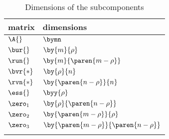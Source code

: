 \begin{table}[htdp]
\caption[Dimensions of the subcomponents]{Dimensions of the subcomponents}
\begin{center}
\begin{tabular}{ll}
%
  matrix    & dimensions \\\hline
%
\arrayrulecolor{gray}
%
  $\A{}$      & $\bymn$ \\\hline
%
  $\bur{}$    & $\by{m}{\rho}$ \\
%
  $\run{}$    & $\by{m}{\paren{m-\rho}}$ \\[3pt]\hline
%
  $\bvr{*}$   & $\by{\rho}{n}$ \\
%
  $\rvn{*}$   & $\by{\paren{n-\rho}}{n}$ \\[3pt]\hline
%
  $\ess{}$    & $\byy{\rho}$ \\
%
  $\zero_{1}$ & $\by{\rho}{\paren{n-\rho}}$ \\
%
  $\zero_{2}$ & $\by{\paren{m-\rho}}{\rho}$ \\
%
  $\zero_{3}$ & $\by{\paren{m-\rho}}{\paren{n-\rho}}$ \\
%
\arrayrulecolor{black}
%
\end{tabular}
\end{center}
\label{default}
\end{table}%

\endinput